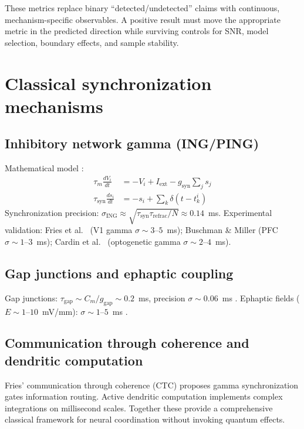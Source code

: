 \documentclass[twocolumn,10pt]{article}
\begin{document}
These metrics replace binary ``detected/undetected'' claims with continuous,
mechanism-specific observables. A positive result must move the appropriate
metric in the predicted direction while surviving controls for SNR, model
selection, boundary effects, and sample stability.



\section{Classical synchronization mechanisms}
\subsection{Inhibitory network gamma (ING/PING)}
Mathematical model \cite{Borgers2003,Brunel2003,Buzsaki2012}:
\begin{align}
\tau_m \frac{dV_i}{dt} &= -V_i + I_{\text{ext}} - g_{\text{syn}}
\sum_j s_j \\
\tau_{\text{syn}} \frac{ds_i}{dt} &= -s_i + \sum_k \delta(t - t_k^i)
\end{align}
Synchronization precision: $\sigma_{\text{ING}} \approx \sqrt{\tau_{\text{syn}}
\tau_{\text{refrac}}/N} \approx 0.14$~ms. Experimental validation: Fries
et al.\ \cite{Fries2001} (V1 gamma $\sigma \sim 3\text{--}5$~ms); Buschman
\& Miller \cite{Buschman2007} (PFC $\sigma \sim 1\text{--}3$~ms); Cardin
et al.\ \cite{Cardin2009} (optogenetic gamma $\sigma \sim 2\text{--}4$~ms).

\subsection{Gap junctions and ephaptic coupling}
Gap junctions: $\tau_{\text{gap}} \sim C_m/g_{\text{gap}} \sim 0.2$~ms,
precision $\sigma \sim 0.06$~ms \cite{Galarreta1999,Bennett2004}. Ephaptic
fields ($E \sim 1\text{--}10$~mV/mm): $\sigma \sim 1\text{--}5$~ms
\cite{Anastassiou2011,Frohlich2010}.

\subsection{Communication through coherence and dendritic computation}
Fries' communication through coherence (CTC) \cite{Fries2015} proposes
gamma synchronization gates information routing. Active dendritic
computation \cite{Poirazi2020} implements complex integrations on
millisecond scales. Together these provide a comprehensive classical
framework for neural coordination without invoking quantum effects.
\end{document}
